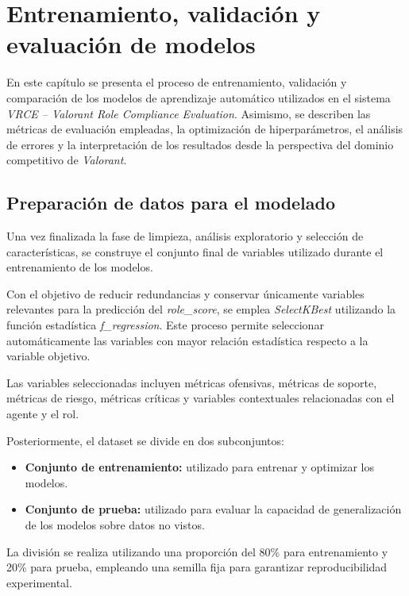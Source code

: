 \documentclass{ULBreport} %
\begin{document}
\chapter{Entrenamiento, validación y evaluación de modelos}

En este capítulo se presenta el proceso de entrenamiento, validación y comparación de los modelos de aprendizaje automático utilizados en el sistema \textit{VRCE -- Valorant Role Compliance Evaluation}. Asimismo, se describen las métricas de evaluación empleadas, la optimización de hiperparámetros, el análisis de errores y la interpretación de los resultados desde la perspectiva del dominio competitivo de \textit{Valorant}.

\section{Preparación de datos para el modelado}

Una vez finalizada la fase de limpieza, análisis exploratorio y selección de características, se construye el conjunto final de variables utilizado durante el entrenamiento de los modelos.

Con el objetivo de reducir redundancias y conservar únicamente variables relevantes para la predicción del \textit{role\_score}, se emplea \textit{SelectKBest} utilizando la función estadística \textit{f\_regression}. Este proceso permite seleccionar automáticamente las variables con mayor relación estadística respecto a la variable objetivo.

Las variables seleccionadas incluyen métricas ofensivas, métricas de soporte, métricas de riesgo, métricas críticas y variables contextuales relacionadas con el agente y el rol.

Posteriormente, el dataset se divide en dos subconjuntos:

\begin{itemize}
    \item \textbf{Conjunto de entrenamiento:} utilizado para entrenar y optimizar los modelos.
    \item \textbf{Conjunto de prueba:} utilizado para evaluar la capacidad de generalización de los modelos sobre datos no vistos.
\end{itemize}

La división se realiza utilizando una proporción del 80\% para entrenamiento y 20\% para prueba, empleando una semilla fija para garantizar reproducibilidad experimental.
\end{document}
